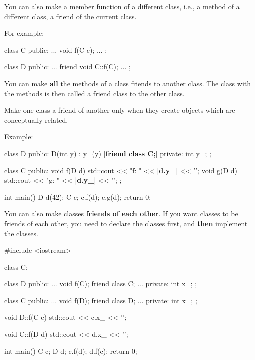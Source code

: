 \newpage{}

You can also make a member function of a different class, i.e., a method
of a different class, a friend of the current class.

For example:

\begin{consolethree}[escapeinside=||]
class C
{
public:
    ...
    void f(C c);
    ...
};

class D
{
public:
    ...
    friend void C::f(C);
    ...
};
\end{consolethree}


\newpage{}

You can make \textbf{all} the methods of a class friends to another
class. The class with the methods is then called a friend class to the
other class.

Make one class a friend of another only when they create objects which
are conceptually related.

Example:

\begin{consolethree}[escapeinside=||]
class D
{
public:
    D(int y)
        : y_(y)
    {}
    |{\bf friend class C;}|
private:
    int y_;
};

class C
{
public:
    void f(D d)
    {
        std::cout << "f: " << |{\bf d.y\_}| << '\n';
    }
    void g(D d)
    {
        std::cout << "g: " << |{\bf d.y\_}| << '\n';
    }
};

int main()
{
    D d(42);
    C c;
    c.f(d);
    c.g(d);
    return 0;
}
\end{consolethree}

You can also make classes \textbf{friends of each other}. If you want
classes to be friends of each other, you need to declare the classes
first, and \textbf{then} implement the classes.

\begin{consolethree}[escapeinside=||]
#include <iostream>

class C;

class D
{
public:
    ...
    void f(C);
    friend class C;
    ...
private:
    int x_;
};

class C
{
public:
    ...
    void f(D);
    friend class D;
    ...
private:
    int x_;
};

void D::f(C c)
{
    std::cout << c.x_ << '\n';
}

void C::f(D d)
{
    std::cout << d.x_ << '\n';
}

int main()
{
    C c;
    D d;
    c.f(d);
    d.f(c);
    return 0;
}
\end{consolethree}

